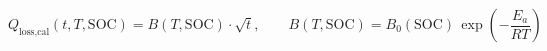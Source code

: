 \documentclass[preview]{standalone}
\begin{document}
\[Q_\text{loss,cal}(t, T, \text{SOC}) = B(T, \text{SOC}) \cdot \sqrt{t}, \qquad B(T, \text{SOC}) = B_0(\text{SOC})\,\exp\!\left(-\frac{E_a}{RT}\right) \tag{7.12}\]
\end{document}
